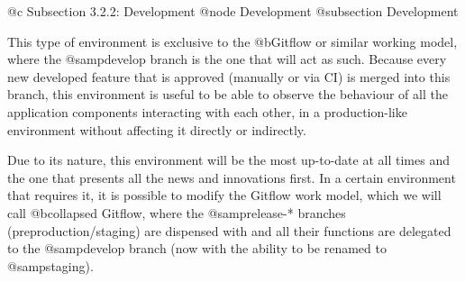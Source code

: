 @c Subsection 3.2.2: Development
@node Development
@subsection Development

This type of environment is exclusive to the @b{Gitflow} or similar working model, where the @samp{develop} branch is the one that will act as such. Because every new developed feature that is approved (manually or via CI) is merged into this branch, this environment is useful to be able to observe the behaviour of all the application components interacting with each other, in a production-like environment without affecting it directly or indirectly.

Due to its nature, this environment will be the most up-to-date at all times and the one that presents all the news and innovations first. In a certain environment that requires it, it is possible to modify the Gitflow work model, which we will call @b{collapsed Gitflow}, where the @samp{release-*} branches (preproduction/staging) are dispensed with and all their functions are delegated to the @samp{develop} branch (now with the ability to be renamed to @samp{staging}).
